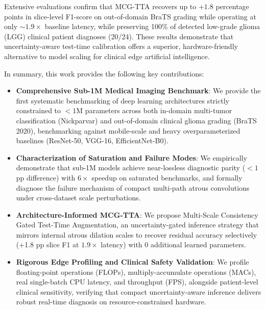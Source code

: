 Extensive evaluations confirm that MCG-TTA recovers up to $+1.8$ percentage points in slice-level F1-score on out-of-domain BraTS grading while operating at only $\sim 1.9\times$ baseline latency, while preserving 100\% of detected low-grade glioma (LGG) clinical patient diagnoses (20/24). These results demonstrate that uncertainty-aware test-time calibration offers a superior, hardware-friendly alternative to model scaling for clinical edge artificial intelligence.

In summary, this work provides the following key contributions:
\begin{itemize}
\item \textbf{Comprehensive Sub-1M Medical Imaging Benchmark}: We provide the first systematic benchmarking of deep learning architectures strictly constrained to $<1\text{M}$ parameters across both in-domain multi-tumor classification (Nickparvar) and out-of-domain clinical glioma grading (BraTS 2020), benchmarking against mobile-scale and heavy overparameterized baselines (ResNet-50, VGG-16, EfficientNet-B0).
\item \textbf{Characterization of Saturation and Failure Modes}: We empirically demonstrate that sub-1M models achieve near-lossless diagnostic parity ($<1$ pp difference) with $6\times$ speedup on saturated benchmarks, and formally diagnose the failure mechanism of compact multi-path atrous convolutions under cross-dataset scale perturbations.
\item \textbf{Architecture-Informed MCG-TTA}: We propose Multi-Scale Consistency Gated Test-Time Augmentation, an uncertainty-gated inference strategy that mirrors internal atrous dilation scales to recover residual accuracy selectively (+1.8 pp slice F1 at $1.9\times$ latency) with 0 additional learned parameters.
\item \textbf{Rigorous Edge Profiling and Clinical Safety Validation}: We profile floating-point operations (FLOPs), multiply-accumulate operations (MACs), real single-batch CPU latency, and throughput (FPS), alongside patient-level clinical sensitivity, verifying that compact uncertainty-aware inference delivers robust real-time diagnosis on resource-constrained hardware.
\end{itemize}
